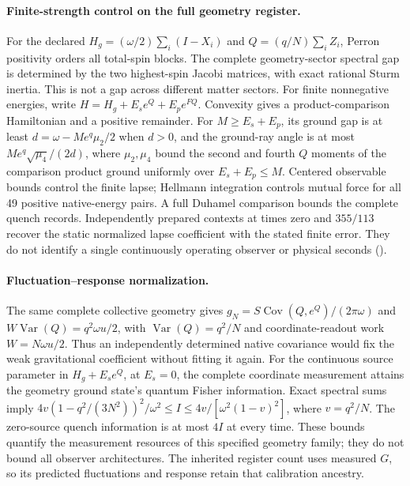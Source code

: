 \paragraph{Finite-strength control on the full geometry register.}
For the declared $H_g=(\omega/2)\sum_i(I-X_i)$ and
$Q=(q/N)\sum_iZ_i$, Perron positivity orders all total-spin
blocks. The complete geometry-sector spectral gap is determined by the two
highest-spin Jacobi matrices, with exact rational Sturm inertia. This is not
a gap across different matter sectors. For finite nonnegative energies,
write $H=H_g+E_s e^Q+E_p e^{FQ}$. Convexity gives a product-comparison
Hamiltonian and a positive remainder. For $M\ge E_s+E_p$, its ground gap
is at least $d=\omega-Me^q\mu_2/2$ when $d>0$, and the ground-ray
angle is at most $Me^q\sqrt{\mu_4}/(2d)$, where $\mu_2,\mu_4$ bound the second and fourth $Q$ moments
of the comparison product ground uniformly over $E_s+E_p\le M$.
Centered observable bounds control the finite lapse; Hellmann integration
controls mutual force for all 49 positive native-energy pairs. A full
Duhamel comparison bounds the complete quench records. Independently
prepared contexts at times zero and $355/113$ recover the static normalized
lapse coefficient with the stated finite error. They do not identify a
single continuously operating observer or physical seconds
().

\paragraph{Fluctuation--response normalization.}
The same complete collective geometry gives
$g_N=S\operatorname{Cov}(Q,e^Q)/(2\pi\omega)$ and
$W\operatorname{Var}(Q)=q^2\omega u/2$, with
$\operatorname{Var}(Q)=q^2/N$ and coordinate-readout work
$W=N\omega u/2$. Thus an independently determined native covariance would
fix the weak gravitational coefficient without fitting it again.
For the continuous source parameter in $H_g+E_s e^Q$, at $E_s=0$,
the complete coordinate measurement attains the geometry ground state's
quantum Fisher information. Exact spectral sums imply
$4v(1-q^2/(3N^2))^2/\omega^2\leq I\leq4v/[\omega^2(1-v)^2]$,
where $v=q^2/N$. The zero-source quench information is at most $4I$ at every
time. These bounds quantify the measurement resources of this specified
geometry family; they do not bound all observer architectures.
The inherited register count uses measured $G$, so its predicted fluctuations
and response retain that calibration ancestry.

